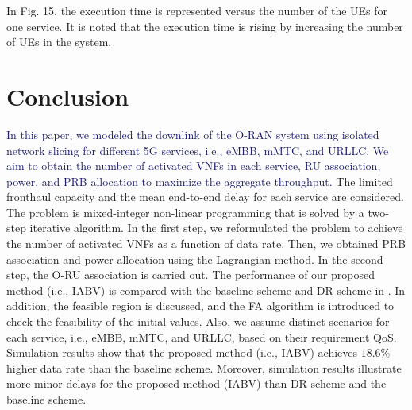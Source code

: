 \documentclass[lettersize,journal]{IEEEtran}
\begin{document}
In Fig. 15, the execution time is represented versus the number of the UEs for one service. It is noted that the execution time is rising by increasing the number of UEs in the system.
\vspace*{-1.8em}
\section{Conclusion}\label{conc}
\textcolor{MidnightBlue}{In this paper, we modeled the downlink of the O-RAN system using isolated network slicing for different 5G services, i.e., eMBB, mMTC, and URLLC.
We aim to obtain the number of activated VNFs in each service, RU association, power, and PRB allocation to maximize the aggregate throughput.} The limited fronthaul capacity and the mean end-to-end delay for each service are considered.
The problem is mixed-integer non-linear programming that is solved by a two-step iterative algorithm.
In the first step, we reformulated the problem to achieve the number of activated VNFs as a function of data rate. Then, we obtained PRB association and power allocation using the Lagrangian method.
In the second step, the O-RU association is carried out.
The performance of our proposed method (i.e., IABV) is compared with the baseline scheme and DR scheme in \cite{lee2018dynamic}.
In addition, the feasible region is discussed, and the FA algorithm is introduced to check the feasibility of the initial values.
Also, we assume distinct scenarios for each service, i.e., eMBB, mMTC, and URLLC, based on their requirement QoS.
Simulation results show that the proposed method (i.e., IABV) achieves $18.6\%$ higher data rate than the baseline scheme.
Moreover, simulation results illustrate more minor delays for the proposed method (IABV) than DR scheme and the baseline scheme.
\vspace*{-0.9em}


%
\end{document}
